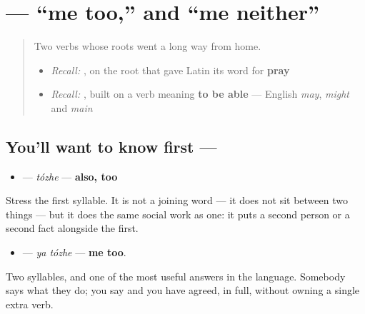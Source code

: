 \section[\texorpdfstring{\ru{тоже} (tózhe)}{тоже (tózhe)}]{ — \textquotedblleft{}me too,\textquotedblright{} and \textquotedblleft{}me neither\textquotedblright{}}

\label{lesson:RU-C16-tozhe}



\begin{quote}
Two verbs whose roots went a long way from home.

\begin{itemize}
\raggedright
  \item \emph{Recall:} \emph{}, on the root that gave Latin its word for \textbf{pray}
  \item \emph{Recall:} \emph{}, built on a verb meaning \textbf{to be able} — English \emph{may}, \emph{might} and \emph{main}
\end{itemize}
\end{quote}

\subsection*{You'll want to know first — }
\begin{itemize}
\raggedright
  \item \textbf{} — \emph{tózhe} — \textbf{also, too}
\end{itemize}

Stress the first syllable. It is not a joining word — it does not sit between two things — but it does the same social work as one: it puts a second person or a second fact alongside the first.

\begin{itemize}
\raggedright
  \item \textbf{ } — \emph{ya tózhe} — \textbf{me too}.
\end{itemize}

Two syllables, and one of the most useful answers in the language. Somebody says what they do; you say \textbf{ } and you have agreed, in full, without owning a single extra verb.

